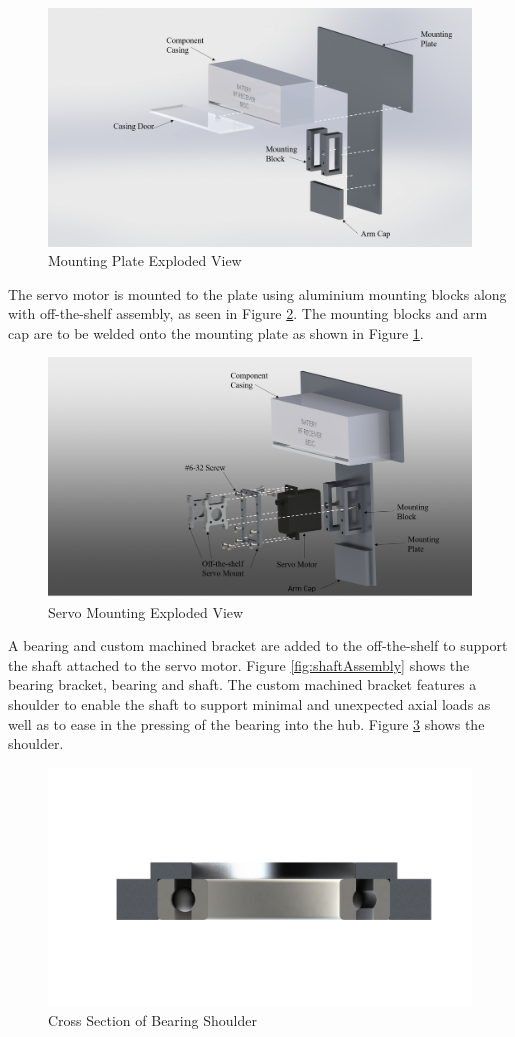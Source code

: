 \documentclass[../main.tex]{subfiles}
\begin{document}
\begin{figure}[H]
	\centering
	\includegraphics[width=.8\linewidth]{img/design/thruster/plateAssembly.png}
	\caption{Mounting Plate Exploded View}
	\label{fig:plateAssembly}
\end{figure}

 The servo motor is mounted to the plate using aluminium mounting blocks along with off-the-shelf assembly, as seen in Figure \ref{fig:servoAssembly}. The mounting blocks and arm cap are to be welded onto the mounting plate as shown in Figure \ref{fig:plateAssembly}.
 
  \begin{figure}[H]
 	\centering
 	\includegraphics[width=.8\linewidth]{img/design/thruster/servoAssembly.png}
 	\caption{Servo Mounting Exploded View}
 	\label{fig:servoAssembly}
 \end{figure}
 
 A bearing and custom machined bracket are added to the off-the-shelf to support the shaft attached to the servo motor. Figure \ref{fig:shaftAssembly} shows the bearing bracket, bearing and shaft. The custom machined bracket features a shoulder to enable the shaft to support minimal and unexpected axial loads as well as to ease in the pressing of the bearing into the hub. Figure \ref{fig:bearingShoulder} shows the shoulder. 
 
   \begin{figure}[H]
 	\centering
 	\includegraphics[width=.4\linewidth]{img/design/thruster/bearingLip.JPG}
 	\caption{Cross Section of Bearing Shoulder}
 	\label{fig:bearingShoulder}
 \end{figure}
 
\end{document}
